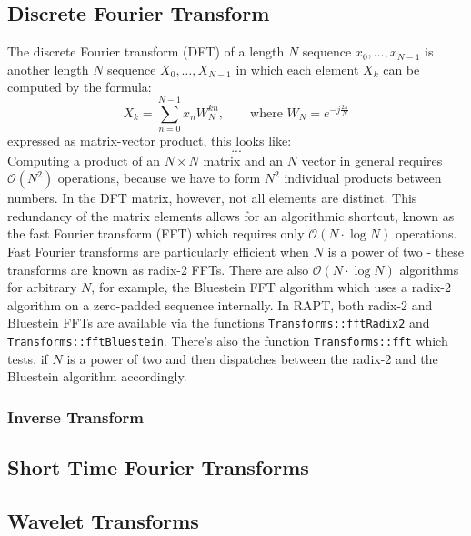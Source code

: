 \subsection{Discrete Fourier Transform}
The discrete Fourier transform (DFT) of a length $N$ sequence $x_0, \ldots, x_{N-1}$ is another length $N$ sequence $X_0, \ldots, X_{N-1}$ in which each element $X_k$ can be computed by the formula:
\begin{equation}
	X_k = \sum_{n=0}^{N-1} x_n W_N^{k n}, \qquad \text{where }W_N = e^{-j \frac{2 \pi}{N} }
\end{equation}
expressed as matrix-vector product, this looks like:
\begin{equation}
	...
\end{equation}
Computing a product of an $N \times N$ matrix and an $N$ vector in general requires $\mathcal{O}(N^2)$ operations, because we have to form $N^2$ individual products between numbers. In the DFT matrix, however, not all elements are distinct. This redundancy of the matrix elements allows for an algorithmic shortcut, known as the fast Fourier transform (FFT) which requires only $\mathcal{O}(N \cdot \log N)$ operations. Fast Fourier transforms are particularly efficient when $N$ is a power of two - these transforms are known as radix-2 FFTs. There are also $\mathcal{O}(N \cdot \log N)$ algorithms for arbitrary $N$, for example, the Bluestein FFT algorithm which uses a radix-2 algorithm on a zero-padded sequence internally. In RAPT, both radix-2 and Bluestein FFTs are available via the functions \texttt{Transforms::fftRadix2} and \texttt{Transforms::fftBluestein}. There's also the function \texttt{Transforms::fft} which tests, if $N$ is a power of two and then dispatches between the radix-2 and the Bluestein algorithm accordingly.

\subsubsection{Inverse Transform}




\subsection{Short Time Fourier Transforms}

\subsection{Wavelet Transforms}

